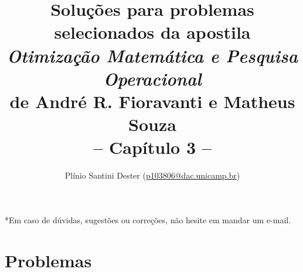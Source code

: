 


\title{	%
		{\Large Soluções para problemas selecionados da apostila\\[-0mm]
        \textit{Otimização Matemática e Pesquisa Operacional}\\[-2mm]
        de André R. Fioravanti e Matheus Souza}\\[2mm]
        -- Capítulo 3 --
}
\author{Plínio Santini Dester (\url{p103806@dac.unicamp.br})}



\maketitle

*Em caso de dúvidas, sugestões ou correções, não hesite em mandar um e-mail.

\setcounter{section}{2}
\section{Problemas}

\newpage

% 


